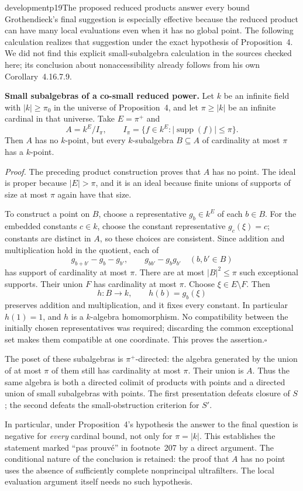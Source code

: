 \begin{dcomment}{development}{p19}{The proposed reduced products answer every bound}
Grothendieck's final suggestion is especially effective because the reduced product can have many local evaluations even when it has no global point. The following calculation realizes that suggestion under the exact hypothesis of Proposition~4. We did not find this explicit small-subalgebra calculation in the sources checked here; its conclusion about nonaccessibility already follows from his own Corollary~4.16.7.9.

\textbf{Small subalgebras of a co-small reduced power.}\ours
Let $k$ be an infinite field with $|k|\ge\pi_0$ in the universe of Proposition~4, and let $\pi\ge|k|$ be an infinite cardinal in that universe. Take $E=\pi^+$ and
\[
 A=k^E/I_\pi,
 \qquad I_\pi=\{f\in k^E:|\operatorname{supp}(f)|\le\pi\}.
\]
Then $A$ has no $k$-point, but every $k$-subalgebra $B\subseteq A$ of cardinality at most $\pi$ has a $k$-point.

\emph{Proof.} The preceding product construction proves that $A$ has no point. The ideal is proper because $|E|>\pi$, and it is an ideal because finite unions of supports of size at most $\pi$ again have that size.

To construct a point on $B$, choose a representative $g_b\in k^E$ of each $b\in B$. For the embedded constants $c\in k$, choose the constant representative $g_c(\xi)=c$; constants are distinct in $A$, so these choices are consistent. Since addition and multiplication hold in the quotient, each of
\[
 g_{b+b'}-g_b-g_{b'},\qquad
 g_{bb'}-g_bg_{b'}
 \quad(b,b'\in B)
\]
has support of cardinality at most $\pi$. There are at most $|B|^2\le\pi$ such exceptional supports. Their union $F$ has cardinality at most $\pi$. Choose $\xi\in E\setminus F$. Then
\[
 h:B\longrightarrow k,\qquad h(b)=g_b(\xi)
\]
preserves addition and multiplication, and it fixes every constant. In particular $h(1)=1$, and $h$ is a $k$-algebra homomorphism. No compatibility between the initially chosen representatives was required; discarding the common exceptional set makes them compatible at one coordinate. This proves the assertion.\hfill$\square$

The poset of these subalgebras is $\pi^+$-directed: the algebra generated by the union of at most $\pi$ of them still has cardinality at most $\pi$. Their union is $A$. Thus the same algebra is both a directed colimit of products with points and a directed union of small subalgebras with points. The first presentation defeats closure of $S$; the second defeats the small-obstruction criterion for $S'$.

In particular, under Proposition~4's hypothesis the answer to the final question is negative for \emph{every} cardinal bound, not only for $\pi=|k|$. This establishes the statement marked ``pas prouv\'e'' in footnote~207 by a direct argument. The conditional nature of the conclusion is retained: the proof that $A$ has no point uses the absence of sufficiently complete nonprincipal ultrafilters. The local evaluation argument itself needs no such hypothesis.
\end{dcomment}

